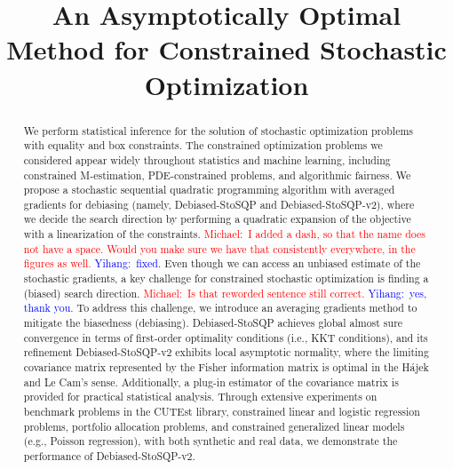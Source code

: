 \documentclass[aos]{imsart}
\numberwithin{equation}{section}
\theoremstyle{plain}
\newcommand{\michael}[1]{\textcolor{red}{Michael:\ #1}}
\newcommand{\yihang}[1]{\textcolor{blue}{Yihang:\ #1}}
\begin{document}
\begin{frontmatter}

\title{An Asymptotically Optimal Method for Constrained Stochastic Optimization}


\begin{abstract}
We perform statistical inference for the solution of stochastic optimization problems with equality and box constraints. 
The constrained optimization problems we considered appear widely throughout statistics and machine learning, including constrained M-estimation, PDE-constrained problems, and algorithmic fairness. 
We propose a stochastic sequential quadratic programming algorithm with averaged gradients for debiasing (namely, Debiased-StoSQP and Debiased-StoSQP-v2), where we decide the search direction by performing a quadratic expansion of the objective with a linearization of the constraints.
\michael{I added a dash, so that the name does not have a space.  Would you make sure we have that consistently everywhere, in the figures as well.}
\yihang{fixed.}
Even though we can access an unbiased estimate of the stochastic gradients, a key challenge for constrained stochastic optimization is finding a (biased) search direction. 
\michael{Is that reworded sentence still correct.}
\yihang{yes, thank you.}
To address this challenge, we introduce an averaging gradients method to mitigate the biasedness (debiasing). 
Debiased-StoSQP achieves global almost sure convergence in terms of first-order optimality conditions (i.e., KKT conditions), and its refinement Debiased-StoSQP-v2 exhibits local asymptotic normality, where the limiting covariance matrix represented by the Fisher information matrix is optimal in the H\'ajek and Le Cam's sense. 
Additionally, a plug-in estimator of the covariance matrix is provided for practical statistical analysis. 
Through extensive experiments on benchmark problems in the CUTEst library, constrained linear and logistic regression problems, portfolio allocation problems, and constrained generalized linear models (e.g., Poisson regression), with both synthetic and real data, we demonstrate the performance of Debiased-StoSQP-v2.
\end{abstract}


\end{frontmatter}
\end{document}
